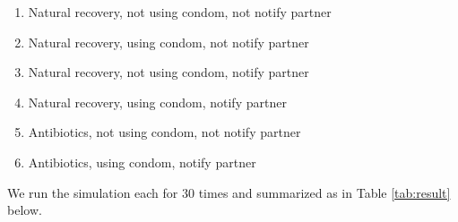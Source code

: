 \documentclass{article}
\begin{document}
\begin{normalsize}
	\begin{enumerate}
		\item Natural recovery, not using condom, not notify partner
		\item Natural recovery, using condom, not notify partner
		\item Natural recovery, not using condom, notify partner
		\item  Natural recovery, using condom, notify partner
		\item Antibiotics, not using condom, not notify partner
		\item  Antibiotics, using condom, notify partner
	\end{enumerate}


We run the simulation each for $30$ times and summarized as in Table \ref{tab:result} below.


\end{normalsize}
\end{document}
